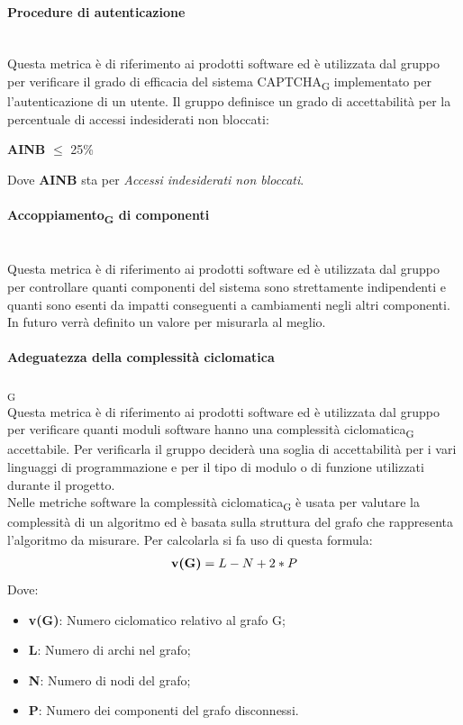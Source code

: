 \paragraph{Procedure di autenticazione}\mbox{}\\
Questa metrica è di riferimento ai prodotti software ed è utilizzata dal gruppo per verificare il grado di efficacia del sistema CAPTCHA\textsubscript{G} implementato per l'autenticazione di un utente. Il gruppo definisce un grado di accettabilità per la percentuale di accessi indesiderati non bloccati:
\begin{center}
	\textbf{AINB} $\le$ 25\%
\end{center}
Dove \textbf{AINB} sta per \textit{Accessi indesiderati non bloccati}.
\paragraph{Accoppiamento\textsubscript{G} di componenti}\mbox{}\\
Questa metrica è di riferimento ai prodotti software ed è utilizzata dal gruppo per controllare quanti componenti del sistema sono strettamente  indipendenti e quanti sono esenti da impatti conseguenti a cambiamenti negli altri componenti.
In futuro verrà definito un valore per misurarla al meglio. 
\paragraph{Adeguatezza della complessità ciclomatica}\textsubscript{G}\mbox{}\\
Questa metrica è di riferimento ai prodotti software ed è utilizzata dal gruppo per verificare quanti moduli software hanno una complessità ciclomatica\textsubscript{G} accettabile. Per verificarla il gruppo deciderà una soglia di accettabilità per i vari linguaggi di programmazione e per il tipo di modulo o di funzione utilizzati durante il progetto.\\
Nelle metriche software la complessità ciclomatica\textsubscript{G} è usata per valutare la complessità di un algoritmo ed è basata sulla struttura del grafo che rappresenta l’algoritmo da misurare. Per calcolarla si fa uso di questa formula:
\begin{align*}
	\centering
	\textbf{v(G)} = L - N + 2 * P
\end{align*}
Dove:
\begin{itemize}
	\item \textbf{v(G)}: Numero ciclomatico relativo al grafo G;
	\item \textbf{L}: Numero di archi nel grafo;
	\item \textbf{N}: Numero di nodi del grafo;
	\item \textbf{P}: Numero dei componenti del grafo disconnessi.
\end{itemize}
